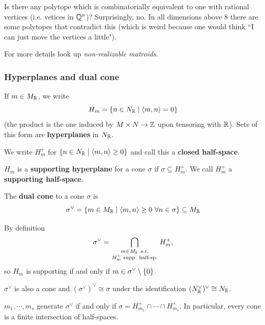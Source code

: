 Is there any polytope which is combinatorially equivalent to one with rational vertices (i.e. vetices in $\mathbb{Q}^n$)? Surprisingly, no. In all dimensions above 8 there are some polytopes that contradict this (which is weird because one would think ``I can just move the vertices a little").

For more details look up \textit{non-realizable matroids}.

\subsubsection{Hyperplanes and dual cone}
\begin{definition}
If $m\in M_{\mathbb{R}}$, we write
\[H_m=\left\{{n\in N_{\mathbb{R}}\mid \left\langle {m,n}\right\rangle=0}\right\}\]
(the product is the one induced by $M\times N\to \mathbb{Z}$ upon tensoring with $\mathbb{R}$). Sets of this form are \textbf{hyperplanes} in $N_{\mathbb{R}}$.

We write $H_m^+$ for $\left\{{n\in N_{\mathbb{R}}\mid \left\langle {m,n}\right\rangle\geq 0}\right\}$ and call this a \textbf{closed half-space}.
\end{definition}

\begin{definition}[]
$H_m$ is a \textbf{supporting hyperplane} for a cone $\sigma$ if $\sigma\subseteq H_m^+$. We call $H_m^+$ a \textbf{supporting half-space}.
\end{definition}


\begin{definition}[]
The \textbf{dual cone} to a cone $\sigma$ is
\[\sigma^\vee=\left\{{m\in M_{\mathbb{R}}\mid \left\langle {m,n}\right\rangle\geq 0\ \forall n\in \sigma}\right\}\subseteq M_{\mathbb{R}}\]
\end{definition}

\begin{remark}
By definition 
\[\sigma^\vee=\bigcap_{\begin{smallmatrix}m\in M_{\mathbb{R}}\ s.t.\\ H_m^+\text{ supp. half-sp.}\end{smallmatrix}}H_m^+,\] so $H_m$ is supporting if and only if $m\in \sigma^\vee\setminus\{0\}$.
\end{remark}

\begin{fact}
$\sigma^\vee$ is also a cone and $(\sigma^\vee)^\vee\cong \sigma$ under the identification $(N_{\mathbb{R}}^\vee)^\vee\cong N_{\mathbb{R}}$.
\end{fact}

\begin{fact}
$m_1,\cdots, m_s$ generate $\sigma^\vee$ if and only if $\sigma=H_{m_1}^+\cap\cdots\cap H_{m_s}^+$.
In particular, every cone is a finite intersection of half-spaces.
\end{fact}


